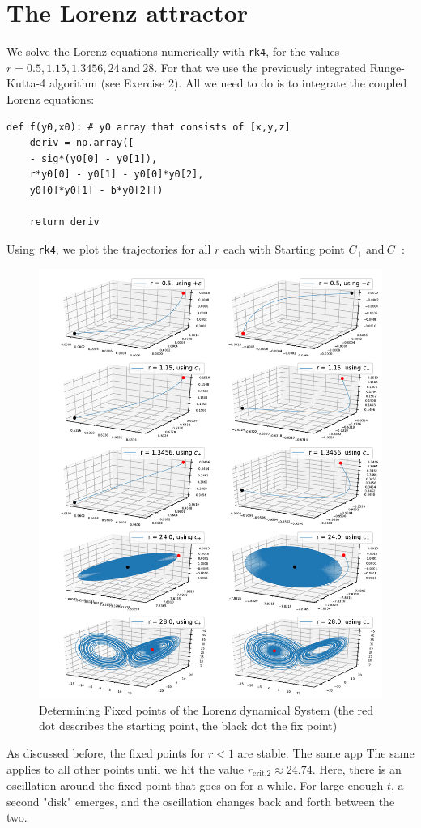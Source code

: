 \documentclass{article}
\begin{document}
\section{The Lorenz attractor}
We solve the Lorenz equations numerically with \texttt{rk4}, for the values
\( r = 0.5, 1.15, 1.3456, 24 \ \text{and} \ 28 \).
For that we use the previously integrated Runge-Kutta-4 algorithm
(see Exercise 2). All we need to do is to integrate the coupled Lorenz equations:
\begin{lstlisting}
def f(y0,x0): # y0 array that consists of [x,y,z]
    deriv = np.array([
    - sig*(y0[0] - y0[1]),
    r*y0[0] - y0[1] - y0[0]*y0[2],
    y0[0]*y0[1] - b*y0[2]])

    return deriv
\end{lstlisting}
Using \texttt{rk4}, we plot the trajectories for all \( r \) each with Starting
point \( C_+ \ \text{and} \ C_- \):
\begin{figure}[H]
    \centering
    \includegraphics[width=.95\textwidth]{Figure2-1.pdf} 
    \caption{Determining Fixed points of the Lorenz dynamical System
    (the red dot describes the starting point, the black dot the fix point)} 
    \label{2-1}
\end{figure}
As discussed before, the fixed points for $r < 1$ are stable. The same app The
same applies to all other points until we hit the value \( r_\text{crit,2}
    \approx 24.74\). Here, there is an oscillation around the fixed point that
goes on for a while. For large enough \( t \), a second "disk" emerges, and the
oscillation changes back and forth between the two.\\[.5cm]
\end{document}
